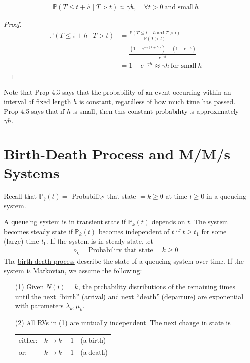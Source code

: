 \begin{proposition}
    \begin{align*}
        \mathbb{P}(T\leqslant t+h\mid T>t) \approx \gamma h,\quad \forall t>0\ \text{and small}\ h
    \end{align*}
\end{proposition}
\begin{proof}
    \begin{align*}
        \mathbb{P}(T\leqslant t+h\mid T>t) &= \frac{\mathbb{P}(T\leqslant t+h\ \text{and}\ T>t)}{\mathbb{P}(T>t)} \\
        &= \frac{(1-e^{-\gamma(t+h)}) - (1-e^{-\gamma t})}{e^{-\gamma t}} \\
        &= 1 - e^{-\gamma h} \approx \gamma h \ \text{for small}\ h
    \end{align*}
\end{proof}

Note that Prop 4.3 says that the probability of an event occurring within an interval of fixed length $h$ is constant, regardless of how much time has passed. Prop 4.5 says that if $h$ is small, then this constant probability is approximately $\gamma h$.


\section{Birth-Death Process and M/M/s Systems}
Recall that $\mathbb{P}_k(t) = $ Probability that state $=k\geqslant 0$ at time $t\geqslant 0$ in a queueing system.
\begin{definition}
    A queueing system is in \uline{transient state} if $\mathbb{P}_k(t)$ depends on $t$. The system becomes \uline{steady state} if $\mathbb{P}_k(t)$ becomes independent of $t$ if $t\geqslant t_1$ for some (large) time $t_1$. If the system is in steady state, let
    \begin{align*}
        p_k = \text{Probability that state} = k \geqslant 0
    \end{align*}
    The \uline{birth-death process} describe the state of a queueing system over time. If the system is Markovian, we assume the following:
    \begin{itemize}
        \item[(1)] Given $N(t) = k$, the probability distributions of the remaining times until the next ``birth'' (arrival) and next ``death'' (departure) are exponential with parameters $\lambda_k,\mu_k$.
        \item[(2)] All RVs in (1) are mutually independent. The next change in state is 
        
        \begin{center}
            \begin{tabular}{lll}
            either: & $k\to k+1$ & (a birth) \\
            or: & $k\to k-1$ & (a death)
        \end{tabular}
        \end{center}     
    \end{itemize}
\end{definition}

